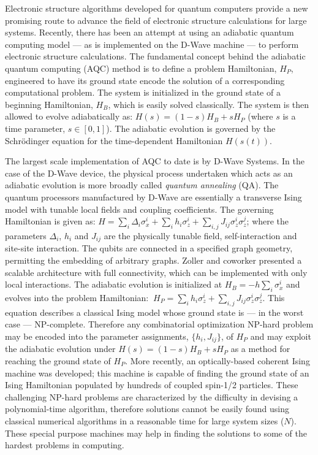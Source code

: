 \documentclass{article}
\begin{document}
Electronic structure algorithms developed for quantum computers provide a new promising route to advance the field of electronic structure calculations for large systems\cite{o2015scalable,Seth}. Recently, there has been an attempt at using an adiabatic quantum computing model --- as is implemented on the D-Wave machine --- to perform electronic structure calculations\cite{Alan-SR}. The fundamental concept behind the adiabatic quantum computing (AQC) method is to define a problem Hamiltonian, $H_P$, engineered to have its ground state encode the solution of a corresponding computational problem. The system is initialized in the ground state of a beginning Hamiltonian, $H_B$, which is easily solved classically.  The system is then allowed to evolve adiabatically as: $H(s)=(1-s) H_B+s H_P$ (where $s$ is a time parameter, $s\in[0,1]$). The adiabatic evolution is governed by the Schr\"odinger equation for the time-dependent Hamiltonian $H(s(t))$. 


The largest scale implementation of AQC to date is by D-Wave Systems\cite{Boixo,Rose}. In the case of the D-Wave device, the physical process undertaken which acts as an adiabatic evolution is more broadly called \emph{quantum annealing} (QA). The quantum processors manufactured by D-Wave are essentially a transverse Ising model with tunable local fields and coupling coefficients.  The governing Hamiltonian is given as: $ H = \sum_i\Delta_i \sigma_x^i + \sum_{i}h_i \sigma_z^i + \sum_{i,j}J_{ij}\sigma_z^i \sigma_z^j$; where the parameters $\Delta_i$, $h_i$ and $J_{ij}$ are the physically tunable field, self-interaction and site-site interaction. The qubits are connected in a specified graph geometry, permitting the embedding of arbitrary graphs. Zoller and coworker presented a scalable architecture with full connectivity, which can be implemented with only local interactions\cite{Zoller}. The adiabatic evolution is initialized at $ H_B = -h\sum_i \sigma_x^i$ and evolves into the problem Hamiltonian: $\ H_P=\sum_{i}h_i \sigma_z^i + \sum_{i,j}J_{ij} \sigma_z^i \sigma_z^j$. This equation describes a classical Ising model whose ground state is --- in the worst case --- \textsc{NP}-complete. Therefore any combinatorial optimization \textsc{NP}-hard problem may be encoded into the parameter assignments, $\{h_i,J_{ij}\}$, of $H_P$ and may exploit the adiabatic evolution under $ H(s)=(1-s) H_B+s H_P$ as a method for reaching the ground state of $H_P$. More recently, an optically-based coherent Ising machine was developed; this machine is capable of finding the ground state of an Ising Hamiltonian populated by hundreds of coupled spin-1/2 particles\cite{Ising-1, Ising-2,Ising-3}. These challenging NP-hard problems are characterized by the difficulty in devising a polynomial-time algorithm, therefore solutions cannot be easily found using classical numerical algorithms in a reasonable time for large system sizes ($N$)\cite{Ising-1,Ising-2,Ising-3}. These special purpose machines may help in finding the solutions to some of the hardest problems in computing.
\end{document}
